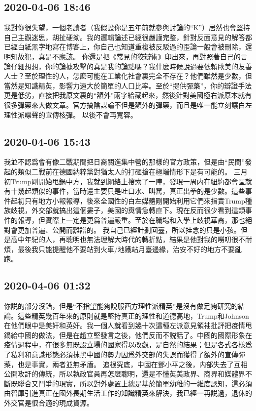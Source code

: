 \documentclass[twocolumn]{ctexart}
\begin{document}
\subsection*{2020-04-06 18:46}

我對你很失望，一個老讀者（我假設你是五年前就參與討論的“K”）居然也會堅持自己主觀迷思，胡扯硬拗。我的邏輯論述已經很嚴謹完整，針對反面意見的解答都已經白紙黑字地寫在博客上，你自己也知道重複被反駁過的歪論一般會被刪除，還明知故犯，真是不應該。
你還是把《常見的狡辯術》印出來，再對照著自己的言論仔細想想，你的論據攻擊的真是我的論點嗎？我什麽時候說過要依賴歐美的友善人士？至於理性的人，怎麽可能在工業化社會裏完全不存在？他們雖然是少數，但當然是知識精英，影響力遠大於簡單的人口比率。至於“提供彈藥”，你的辯證手法更是低劣，直接把我原文裏的“額外”兩字給藏起來，然後針對美國極右派原本就有很多彈藥來大做文章。官方搞陰謀論不但是額外的彈藥，而且是唯一能立刻讓白左理性派噤聲的宣傳核彈。
以後不會再寬容。
\subsection*{2020-04-06 15:43}

我並不認爲會有像二戰期間把日裔關進集中營的那樣的官方政策，但是由“民間”發起的類似二戰前在德國納粹黨對猶太人的打砸搶在極端情形下是有可能的。
三月初Trump剛開始甩鍋中方，我就到網絡上搜索了一陣，發現一周内在紐約都會區就有十幾起類似的事件，當時還主要只是吐口水、叫駡，真正出拳的是少數。這些事件起初只有地方小報報導，後來全國性的白左媒體剛開始利用它們來指責Trump種族歧視，外交部就搞出這個婁子，美國的輿情急轉直下。現在反而很少看到這類事件的報導，但實際上一定是更爲普遍嚴重。至於在職場和入學上歧視華裔，那也絕對會更加普遍、公開而離譜的。
我自己已經計劃回臺，所以挂念的只是小孩。但是高中年紀的人，再聰明也無法理解大時代的轉折點，結果是他對我的嘮叨很不耐煩，最後我只能提醒他不要站到火車/地鐵站月臺邊緣，治安不好的地方不要亂跑。
\subsection*{2020-04-06 01:32}

你説的部分沒錯，但是“不指望能夠說服西方理性派精英”是沒有做足夠研究的結論。這些精英幾百年來的原則就是堅持真正的理性和道德高地，Trump和Johnson在他們眼中是美奸和英奸。我一個人就看到幾十次這種左派意見領袖批評把疫情甩鍋給中國的做法，但是在趙立堅發言之後，他們反而不説話了。中國的國際形象在疫情過程中，在很多無既設立場的國家得以改觀，是自然的結果；但是各式各樣爲了私利和意識形態必須抹黑中國的勢力因爲外交部的失誤而獲得了額外的宣傳彈藥，也是事實，兩者並無矛盾。
追根究底，中國在鄧小平之後，内部失去了互相公開攻訐的傳統，所以執政官員再怎麽聰明，還是不懂英美政界、商界和媒體界不斷既聯合又鬥爭的現實，所以對外處置上總是基於簡單幼稚的一維度認知，這必須由智庫引進真正在國外長期生活工作的知識精英來解決，我已經一再説過，退休的外交官是很合適的現成資源。
\end{document}
